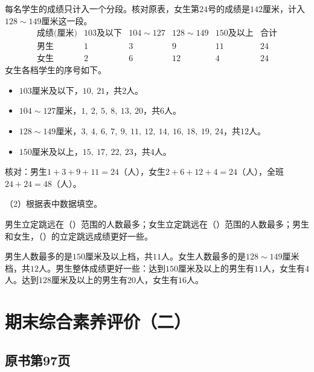 \endgroup\smallskip
\begin{BookAnswer}
每名学生的成绩只计入一个分段。核对原表，女生第\(24\)号的成绩是\(142\)厘米，计入\(128\sim149\)厘米这一段。
\[
\begin{array}{c|rrrr|r}
\text{成绩(厘米)}&103\text{及以下}&104\sim127&128\sim149&150\text{及以上}&\text{合计}\\\hline
\text{男生}&1&3&9&11&24\\
\text{女生}&2&6&12&4&24
\end{array}
\]
女生各档学生的序号如下。
\begin{itemize}
\item \(103\)厘米及以下，\allowbreak{}\(10,\ 21\)，共\(2\)人。
\item \(104\sim127\)厘米，\allowbreak{}\(1,\ 2,\ 5,\ 8,\ 13,\ 20\)，共\(6\)人。
\item \(128\sim149\)厘米，\allowbreak{}\(3,\ 4,\ 6,\ 7,\ 9,\ 11,\ 12,\ 14,\ 16,\ 18,\ 19,\ 24\)，共\(12\)人。
\item \(150\)厘米及以上，\allowbreak{}\(15,\ 17,\ 22,\ 23\)，共\(4\)人。
\end{itemize}
核对：男生\(1+3+9+11=24\)（人），女生\(2+6+12+4=24\)（人），全班\(24+24=48\)（人）。
\end{BookAnswer}

（2）根据表中数据填空。\par 男生立定跳远在（\hspace{1.8em}）范围的人数最多；女生立定跳远在（\hspace{1.8em}）范围的人数最多；男生和女生，（\hspace{1.8em}）的立定跳远成绩更好一些。\par
\begin{BookAnswer}
男生人数最多的是\(150\)厘米及以上档，共\(11\)人。女生人数最多的是\(128\sim149\)厘米档，共\(12\)人。男生整体成绩更好一些：达到\(150\)厘米及以上的男生有\(11\)人，女生有\(4\)人。达到\(128\)厘米及以上的男生有\(20\)人，女生有\(16\)人。
\end{BookAnswer}


\section{期末综合素养评价（二）}



\subsection*{原书第97页}

